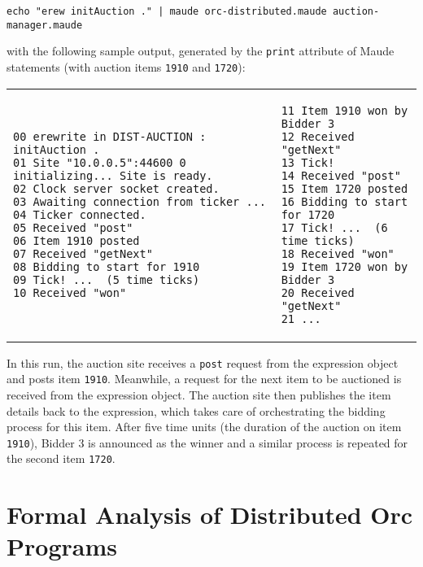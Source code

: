 \documentclass{eptcs}
\begin{document}
\begin{small}
\begin{verbatim}
echo "erew initAuction ." | maude orc-distributed.maude auction-manager.maude 
\end{verbatim}
\end{small}

\noindent with the following sample output, generated by the \texttt{print} attribute of Maude statements (with auction items \texttt{1910} and \texttt{1720}): 
 


\begin{tabular}{@{}p{} p{}@{}}
\begin{scriptsize}
\begin{verbatim}
00 erewrite in DIST-AUCTION : initAuction .
01 Site "10.0.0.5":44600 0 initializing... Site is ready.
02 Clock server socket created. 
03 Awaiting connection from ticker ...
04 Ticker connected.
05 Received "post"
06 Item 1910 posted
07 Received "getNext"
08 Bidding to start for 1910
09 Tick! ...  (5 time ticks)
10 Received "won"
\end{verbatim}
\end{scriptsize}  
&
\begin{scriptsize}
\begin{verbatim}
11 Item 1910 won by Bidder 3
12 Received "getNext"
13 Tick!
14 Received "post"
15 Item 1720 posted
16 Bidding to start for 1720
17 Tick! ...  (6 time ticks)
18 Received "won"
19 Item 1720 won by Bidder 3
20 Received "getNext"
21 ...
\end{verbatim}
\end{scriptsize}
\end{tabular}

In this run, the auction site receives a \texttt{post} request from the  expression object and posts item \texttt{1910}. Meanwhile, a request for the next item to be auctioned is received from  the  expression object. The auction site then publishes the item details back to the  expression, which takes care of orchestrating the bidding process for this item. After five time units (the duration of the auction on item \texttt{1910}), Bidder 3 is announced as the winner and a similar process is repeated for the second item \texttt{1720}.

\section{Formal Analysis of Distributed Orc Programs} \label{sec:formal-analysis}
\end{document}

